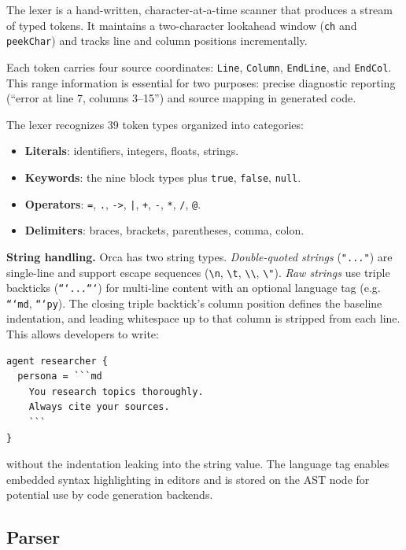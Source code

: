 \documentclass[sigconf,nonacm]{acmart}
\begin{document}
The lexer is a hand-written, character-at-a-time scanner that produces a
stream of typed tokens. It maintains a two-character lookahead window
(\texttt{ch} and \texttt{peekChar}) and tracks line and column positions
incrementally.

Each token carries four source coordinates: \texttt{Line}, \texttt{Column},
\texttt{EndLine}, and \texttt{EndCol}. This range information is essential
for two purposes: precise diagnostic reporting (``error at line 7, columns
3--15'') and source mapping in generated code.

The lexer recognizes 39 token types organized into categories:

\begin{itemize}[leftmargin=*]
  \item \textbf{Literals}: identifiers, integers, floats, strings.
  \item \textbf{Keywords}: the nine block types plus \texttt{true},
        \texttt{false}, \texttt{null}.
  \item \textbf{Operators}: \texttt{=}, \texttt{.}, \texttt{->},
        \texttt{|}, \texttt{+}, \texttt{-}, \texttt{*}, \texttt{/},
        \texttt{@}.
  \item \textbf{Delimiters}: braces, brackets, parentheses, comma, colon.
\end{itemize}

\noindent\textbf{String handling.} Orca has two string types.
\emph{Double-quoted strings} (\texttt{"..."}) are single-line and support
escape sequences (\texttt{\textbackslash n}, \texttt{\textbackslash t},
\texttt{\textbackslash\textbackslash}, \texttt{\textbackslash"}).
\emph{Raw strings} use triple backticks (\texttt{```...```}) for
multi-line content with an optional language tag (e.g.
\texttt{```md}, \texttt{```py}). The closing triple backtick's column
position defines the baseline indentation, and leading whitespace up to
that column is stripped from each line. This allows developers to write:

\begin{lstlisting}
agent researcher {
  persona = ```md
    You research topics thoroughly.
    Always cite your sources.
    ```
}
\end{lstlisting}

\noindent without the indentation leaking into the string value. The
language tag enables embedded syntax highlighting in editors and is
stored on the AST node for potential use by code generation backends.

\subsection{Parser}
\label{sec:compiler:parser}
\end{document}
